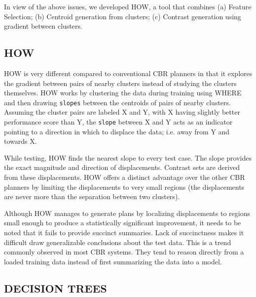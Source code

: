 \documentclass{sig-alternate}
\begin{document}
In view of the above issues, we developed HOW, a tool that combines (a) Feature Selection; (b) Centroid generation from clusters; (c) Contrast generation using gradient between clusters.


\subsection{HOW}

HOW is very different compared to conventional CBR planners in that it explores the gradient between pairs of nearby clusters instead of studying the clusters themselves. HOW works by clustering the data during training using WHERE and then drawing \texttt{slopes} between the centroids of pairs of nearby clusters. Assuming the cluster pairs are labeled X and Y, with X having slightly better performance score than Y, the \texttt{slope} between X and Y acts as an indicator pointing to a direction in which to displace the data; i.e. away from Y and towards X. 

While testing, HOW finds the nearest slope to every test case. The slope provides the exact magnitude and direction of displacements. Contrast sets are derived from these displacements. HOW offers a distinct advantage over the other CBR planners by limiting the displacements to very small regions (the displacements are never more than the separation between two clusters). 

Although HOW manages to generate plans by localizing displacements to regions small enough to produce a statistically significant improvement, it needs to be noted that it fails to provide succinct summaries. Lack of succinctness makes it difficult draw generalizable conclusions about the test data. This is a trend commonly observed in most CBR systems. They tend to reason directly from a loaded training data instead of first summarizing the data into a model. 



\subsection{DECISION TREES}
\end{document}
